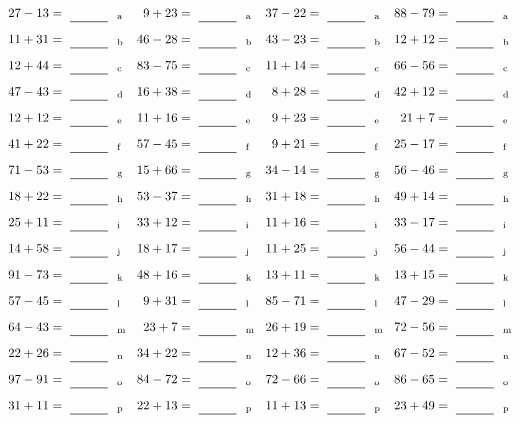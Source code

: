 \documentclass
[
  draft    = true,
  fontsize = 11pt,
  parskip  = half-
]
{scrartcl}
\begin{document}
\clearpage
\begin{align*}
    \pline{27-13}&=\rline{a}
  & \pline{9+23}&=\rline{a}
  & \pline{37-22}&=\rline{a}
  & \pline{88-79}&=\rline{a} \\[1ex]
    \pline{11+31}&=\rline{b}
  & \pline{46-28}&=\rline{b}
  & \pline{43-23}&=\rline{b}
  & \pline{12+12}&=\rline{b} \\[1ex]
    \pline{12+44}&=\rline{c}
  & \pline{83-75}&=\rline{c}
  & \pline{11+14}&=\rline{c}
  & \pline{66-56}&=\rline{c} \\[1ex]
    \pline{47-43}&=\rline{d}
  & \pline{16+38}&=\rline{d}
  & \pline{8+28}&=\rline{d}
  & \pline{42+12}&=\rline{d} \\[1ex]
    \pline{12+12}&=\rline{e}
  & \pline{11+16}&=\rline{e}
  & \pline{9+23}&=\rline{e}
  & \pline{21+7}&=\rline{e} \\[1ex]
    \pline{41+22}&=\rline{f}
  & \pline{57-45}&=\rline{f}
  & \pline{9+21}&=\rline{f}
  & \pline{25-17}&=\rline{f} \\[1ex]
    \pline{71-53}&=\rline{g}
  & \pline{15+66}&=\rline{g}
  & \pline{34-14}&=\rline{g}
  & \pline{56-46}&=\rline{g} \\[1ex]
    \pline{18+22}&=\rline{h}
  & \pline{53-37}&=\rline{h}
  & \pline{31+18}&=\rline{h}
  & \pline{49+14}&=\rline{h} \\[1ex]
    \pline{25+11}&=\rline{i}
  & \pline{33+12}&=\rline{i}
  & \pline{11+16}&=\rline{i}
  & \pline{33-17}&=\rline{i} \\[1ex]
    \pline{14+58}&=\rline{j}
  & \pline{18+17}&=\rline{j}
  & \pline{11+25}&=\rline{j}
  & \pline{56-44}&=\rline{j} \\[1ex]
    \pline{91-73}&=\rline{k}
  & \pline{48+16}&=\rline{k}
  & \pline{13+11}&=\rline{k}
  & \pline{13+15}&=\rline{k} \\[1ex]
    \pline{57-45}&=\rline{l}
  & \pline{9+31}&=\rline{l}
  & \pline{85-71}&=\rline{l}
  & \pline{47-29}&=\rline{l} \\[1ex]
    \pline{64-43}&=\rline{m}
  & \pline{23+7}&=\rline{m}
  & \pline{26+19}&=\rline{m}
  & \pline{72-56}&=\rline{m} \\[1ex]
    \pline{22+26}&=\rline{n}
  & \pline{34+22}&=\rline{n}
  & \pline{12+36}&=\rline{n}
  & \pline{67-52}&=\rline{n} \\[1ex]
    \pline{97-91}&=\rline{o}
  & \pline{84-72}&=\rline{o}
  & \pline{72-66}&=\rline{o}
  & \pline{86-65}&=\rline{o} \\[1ex]
    \pline{31+11}&=\rline{p}
  & \pline{22+13}&=\rline{p}
  & \pline{11+13}&=\rline{p}
  & \pline{23+49}&=\rline{p}
\end{align*}
\end{document}
